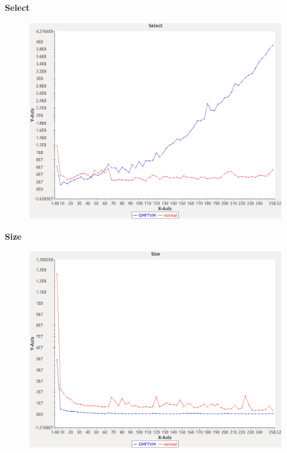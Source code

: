 \noindent\textbf{Select}

\begin{figure}[h]
\centering
\includegraphics[width=\textwidth]{../graphs/orderedset/Select}
\end{figure}
\pagebreak

\noindent\textbf{Size}

\begin{figure}[h]
\centering
\includegraphics[width=\textwidth]{../graphs/orderedset/Size}
\end{figure}
\pagebreak

